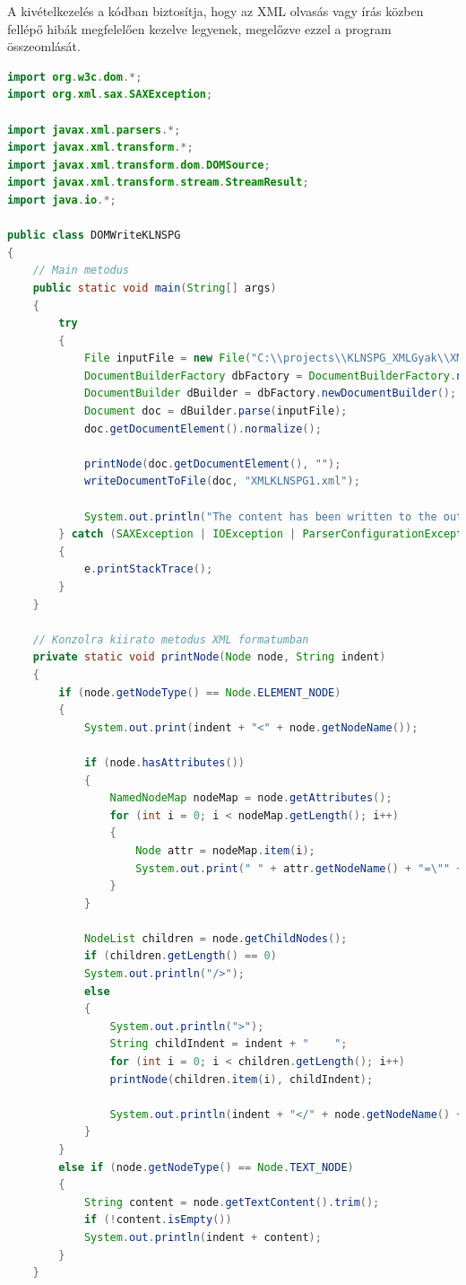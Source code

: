 \documentclass[12pt]{report}
\begin{document}
A kivételkezelés a kódban biztosítja, hogy az XML olvasás vagy írás közben fellépő hibák megfelelően kezelve legyenek, megelőzve ezzel a program összeomlását.\\

\begin{lstlisting}[caption={DOMWriteKLNSPG.java} olvasó program, language=Java]
import org.w3c.dom.*;
import org.xml.sax.SAXException;

import javax.xml.parsers.*;
import javax.xml.transform.*;
import javax.xml.transform.dom.DOMSource;
import javax.xml.transform.stream.StreamResult;
import java.io.*;

public class DOMWriteKLNSPG
{
	// Main metodus
	public static void main(String[] args)
	{
		try 
		{
			File inputFile = new File("C:\\projects\\KLNSPG_XMLGyak\\XMLTaskKLNSPG\\XMLKLNSPG.xml");
			DocumentBuilderFactory dbFactory = DocumentBuilderFactory.newInstance();
			DocumentBuilder dBuilder = dbFactory.newDocumentBuilder();
			Document doc = dBuilder.parse(inputFile);
			doc.getDocumentElement().normalize();
			
			printNode(doc.getDocumentElement(), "");
			writeDocumentToFile(doc, "XMLKLNSPG1.xml");
			
			System.out.println("The content has been written to the output file successfully.");
		} catch (SAXException | IOException | ParserConfigurationException | TransformerException e) 
		{
			e.printStackTrace();
		}
	}
	
	// Konzolra kiirato metodus XML formatumban
	private static void printNode(Node node, String indent) 
	{
		if (node.getNodeType() == Node.ELEMENT_NODE) 
		{
			System.out.print(indent + "<" + node.getNodeName());
			
			if (node.hasAttributes()) 
			{
				NamedNodeMap nodeMap = node.getAttributes();
				for (int i = 0; i < nodeMap.getLength(); i++) 
				{
					Node attr = nodeMap.item(i);
					System.out.print(" " + attr.getNodeName() + "=\"" + attr.getNodeValue() + "\"");
				}
			}
			
			NodeList children = node.getChildNodes();
			if (children.getLength() == 0)
			System.out.println("/>");
			else 
			{
				System.out.println(">");
				String childIndent = indent + "    ";
				for (int i = 0; i < children.getLength(); i++)
				printNode(children.item(i), childIndent);
				
				System.out.println(indent + "</" + node.getNodeName() + ">");
			}
		} 
		else if (node.getNodeType() == Node.TEXT_NODE) 
		{
			String content = node.getTextContent().trim();
			if (!content.isEmpty())
			System.out.println(indent + content);
		}
	}    
	

\end{lstlisting}
\end{document}
